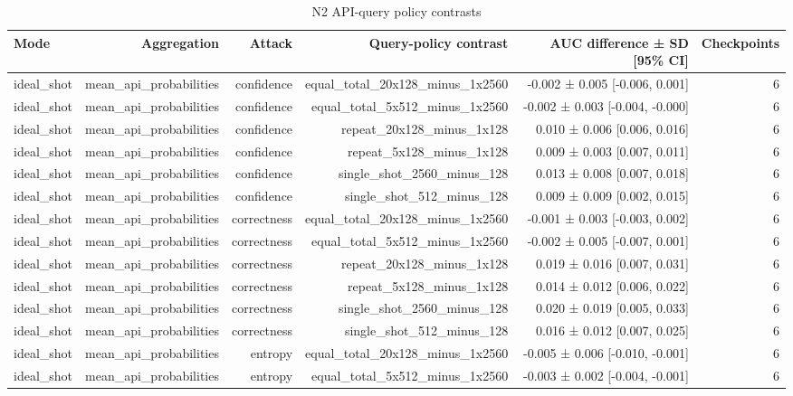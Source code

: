 \begin{table}
\caption{N2 API-query policy contrasts}
\label{tab:satml_noise_n2_queries}
\begin{tabular}{lrrrrr}
\toprule
Mode & Aggregation & Attack & Query-policy contrast & AUC difference ± SD [95\% CI] & Checkpoints \\
\midrule
ideal\_shot & mean\_api\_probabilities & confidence & equal\_total\_20x128\_minus\_1x2560 & -0.002 ± 0.005 [-0.006, 0.001] & 6 \\
ideal\_shot & mean\_api\_probabilities & confidence & equal\_total\_5x512\_minus\_1x2560 & -0.002 ± 0.003 [-0.004, -0.000] & 6 \\
ideal\_shot & mean\_api\_probabilities & confidence & repeat\_20x128\_minus\_1x128 & 0.010 ± 0.006 [0.006, 0.016] & 6 \\
ideal\_shot & mean\_api\_probabilities & confidence & repeat\_5x128\_minus\_1x128 & 0.009 ± 0.003 [0.007, 0.011] & 6 \\
ideal\_shot & mean\_api\_probabilities & confidence & single\_shot\_2560\_minus\_128 & 0.013 ± 0.008 [0.007, 0.018] & 6 \\
ideal\_shot & mean\_api\_probabilities & confidence & single\_shot\_512\_minus\_128 & 0.009 ± 0.009 [0.002, 0.015] & 6 \\
ideal\_shot & mean\_api\_probabilities & correctness & equal\_total\_20x128\_minus\_1x2560 & -0.001 ± 0.003 [-0.003, 0.002] & 6 \\
ideal\_shot & mean\_api\_probabilities & correctness & equal\_total\_5x512\_minus\_1x2560 & -0.002 ± 0.005 [-0.007, 0.001] & 6 \\
ideal\_shot & mean\_api\_probabilities & correctness & repeat\_20x128\_minus\_1x128 & 0.019 ± 0.016 [0.007, 0.031] & 6 \\
ideal\_shot & mean\_api\_probabilities & correctness & repeat\_5x128\_minus\_1x128 & 0.014 ± 0.012 [0.006, 0.022] & 6 \\
ideal\_shot & mean\_api\_probabilities & correctness & single\_shot\_2560\_minus\_128 & 0.020 ± 0.019 [0.005, 0.033] & 6 \\
ideal\_shot & mean\_api\_probabilities & correctness & single\_shot\_512\_minus\_128 & 0.016 ± 0.012 [0.007, 0.025] & 6 \\
ideal\_shot & mean\_api\_probabilities & entropy & equal\_total\_20x128\_minus\_1x2560 & -0.005 ± 0.006 [-0.010, -0.001] & 6 \\
ideal\_shot & mean\_api\_probabilities & entropy & equal\_total\_5x512\_minus\_1x2560 & -0.003 ± 0.002 [-0.004, -0.001] & 6 \\

\end{tabular}
\end{table}
